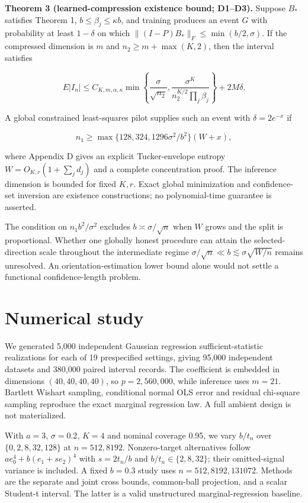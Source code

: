 \documentclass[
  11pt,
]{article}
\begin{document}
\textbf{Theorem 3 (learned-compression existence bound; D1--D3).}
Suppose \(B_*\) satisfies Theorem 1, \(b\le\beta_j\le\kappa b\), and
training produces an event \(G\) with probability at least \(1-\delta\)
on which \(\|(I-P)B_*\|_F\le\min(b/2,\sigma)\). If the compressed
dimension is \(m\) and \(n_2\ge m+\max(K,2)\), then the interval
satisfies

\[
E|I_n|\le C_{K,m,\alpha,\kappa}
\min\left\{\frac\sigma{\sqrt{n_2}},
\frac{\sigma^K}{n_2^{K/2}\prod_j\beta_j}\right\}+2M\delta.
\]

A global constrained least-squares pilot supplies such an event with
\(\delta=2e^{-x}\) if

\[
n_1\ge\max\{128,324,1296\sigma^2/b^2\}(W+x),
\]

where Appendix D gives an explicit Tucker-envelope entropy
\(W=O_{K,r}(1+\sum_jd_j)\) and a complete concentration proof. The
inference dimension is bounded for fixed \(K,r\). Exact global
minimization and confidence-set inversion are existence constructions;
no polynomial-time guarantee is asserted.

The condition on \(n_1b^2/\sigma^2\) excludes \(b\asymp\sigma/\sqrt n\)
when \(W\) grows and the split is proportional. Whether one globally
honest procedure can attain the selected-direction scale throughout the
intermediate regime \(\sigma/\sqrt n\ll b\lesssim\sigma\sqrt{W/n}\)
remains unresolved. An orientation-estimation lower bound alone would
not settle a functional confidence-length problem.

\section{Numerical study}\label{numerical-study}

We generated 5,000 independent Gaussian regression sufficient-statistic
realizations for each of 19 prespecified settings, giving 95,000
independent datasets and 380,000 paired interval records. The
coefficient is embedded in dimensions \((40,40,40,40)\), so
\(p=2,560,000\), while inference uses \(m=21\). Bartlett Wishart
sampling, conditional normal OLS error and residual chi-square sampling
reproduce the exact marginal regression law. A full ambient design is
not materialized.

With \(a=3\), \(\sigma=0.2\), \(K=4\) and nominal coverage 0.95, we vary
\(b/t_n\) over \(\{0,2,8,32,128\}\) at \(n=512,8192\). Nonzero-target
alternatives follow \(a e_0^4+b(e_1+s e_2)^4\) with \(s=2t_n/b\) and
\(b/t_n\in\{2,8,32\}\); their omitted-signal variance is included. A
fixed \(b=0.3\) study uses \(n=512,8192,131072\). Methods are the
separate and joint cross bounds, common-ball projection, and a scalar
Student-t interval. The latter is a valid unstructured
marginal-regression baseline.
\end{document}
